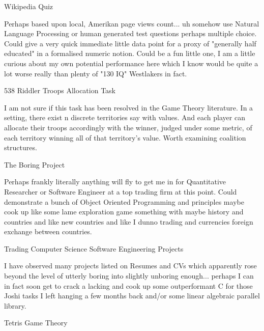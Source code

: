 	Wikipedia Quiz

Perhaps based upon local, Amerikan page views count... uh somehow use Natural Language Processing or human generated test questions perhaps multiple choice. Could give a very quick immediate little data point for a proxy of "generally half educated" in a formalised numeric notion. Could be a fun little one, I am a little curious about my own potential performance here which I know would be quite a lot worse really than plenty of "130 IQ" Westlakers in fact.

	538 Riddler Troops Allocation Task

I am not sure if this task has been resolved in the Game Theory literature. In a setting, there exist n discrete territories say with values. And each player can allocate their troops accordingly with the winner, judged under some metric, of each territory winning all of that territory's value. Worth examining coalition structures.

	The Boring Project

Perhaps frankly literally anything will fly to get me in for Quantitative Researcher or Software Engineer at a top trading firm at this point. Could demonstrate a bunch of Object Oriented Programming and principles maybe cook up like some lame exploration game something with maybe history and countries and like new countries and like I dunno trading and currencies foreign exchange between countries.

	Trading Computer Science Software Engineering Projects

I have observed many projects listed on Resumes and CVs which apparently rose beyond the level of utterly boring into slightly unboring enough... perhaps I can in fact soon get to crack a lacking and cook up some outperformant C for those Joshi tasks I left hanging a few months back and/or some linear algebraic parallel library.

	Tetris Game Theory

